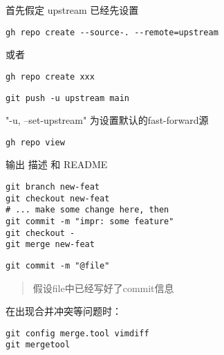 
首先假定 upstream 已经先设置

\begin{lstlisting}
gh repo create --source-. --remote=upstream
\end{lstlisting}

或者

\begin{lstlisting}
gh repo create xxx
\end{lstlisting}


\begin{lstlisting}
git push -u upstream main
\end{lstlisting}

"-u, --set-upstream" 为设置默认的fast-forward源


\begin{lstlisting}
gh repo view
\end{lstlisting}

输出 描述 和 README



\begin{lstlisting}
git branch new-feat
git checkout new-feat
# ... make some change here, then
git commit -m "impr: some feature"
git checkout -
git merge new-feat
\end{lstlisting}


\begin{lstlisting}
git commit -m "@file"
\end{lstlisting}

\begin{quotation}
    假设file中已经写好了commit信息
\end{quotation}


在出现合并冲突等问题时：

\begin{lstlisting}
git config merge.tool vimdiff
git mergetool
\end{lstlisting}
